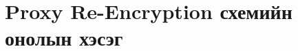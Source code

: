 
\chapter{Proxy Re-Encryption схемийн онолын хэсэг} %
\label{Chapter1} %
\pagecolor{white}

\newcommand{\keyword}[1]{\textbf{#1}}
\newcommand{\tabhead}[1]{\textbf{#1}}
\newcommand{\code}[1]{\texttt{#1}}
\newcommand{\file}[1]{\texttt{\bfseries#1}}
\newcommand{\option}[1]{\texttt{\itshape#1}}


